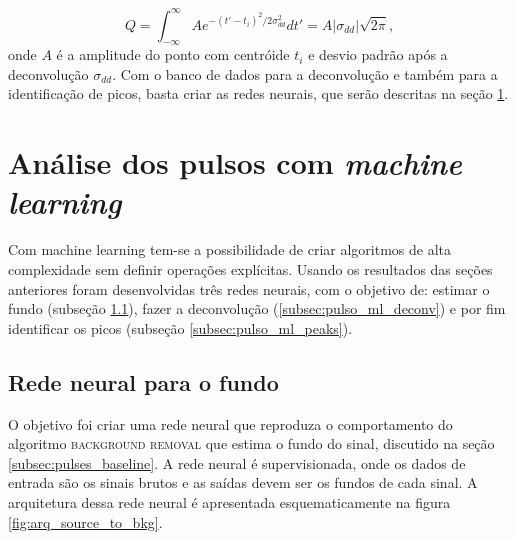 \documentclass[a4paper,12pt,oneside]{book}
\begin{document}

\begin{equation}\label{eq:gauss_area}
    Q = \int^\infty _{-\infty} Ae^{-(t' - t_i)^2 / 2\sigma_{dd}^2} dt' = A\left |\sigma_{dd} \right|\sqrt{2\pi},
\end{equation}
%
onde $A$ é a amplitude do ponto com centróide $t_i$ e desvio padrão após a deconvolução $\sigma_{dd}$. Com o banco de dados para a deconvolução e também para a identificação de picos, basta criar as redes neurais, que serão descritas na seção \ref{sec:pulsos_ml}.

\section{Análise dos pulsos com \textit{machine learning}}\label{sec:pulsos_ml}


\par Com machine learning tem-se a possibilidade de criar algoritmos de alta complexidade sem definir operações explícitas. Usando os resultados das seções anteriores foram desenvolvidas três redes neurais, com o objetivo de: estimar o fundo (subseção \ref{subsec:pulso_ml_fundo}), fazer a deconvolução (\ref{subsec:pulso_ml_deconv}) e por fim identificar os picos (subseção \ref{subsec:pulso_ml_peaks}). 


\subsection{Rede neural para o fundo}\label{subsec:pulso_ml_fundo}

\par O objetivo foi criar uma rede neural que reproduza o comportamento do algoritmo \textsc{background removal} que estima o fundo do sinal, discutido na seção \ref{subsec:pulses_baseline}. A rede neural é supervisionada, onde os dados de entrada são os sinais brutos e as saídas devem ser os fundos de cada sinal. A arquitetura dessa rede neural é apresentada esquematicamente na figura \ref{fig:arq_source_to_bkg}.
\end{document}
